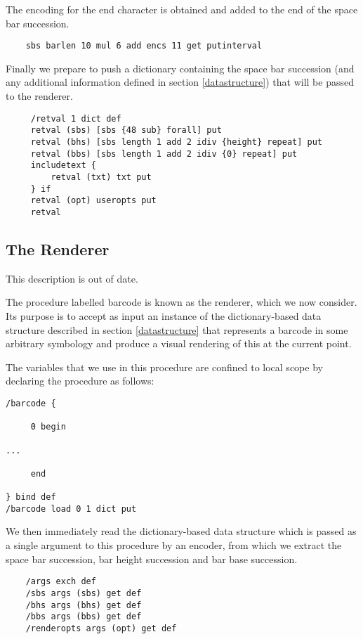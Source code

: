 \documentclass []{article}
\begin{document}
The encoding for the end character is obtained and added to 
the end of the space bar succession.

\begin{verbatim}
    sbs barlen 10 mul 6 add encs 11 get putinterval
\end{verbatim}

Finally we prepare to push a dictionary containing the space bar 
succession (and any additional information defined in section
\ref{datastructure}) that will be passed to the renderer.

\begin{verbatim}
     /retval 1 dict def
     retval (sbs) [sbs {48 sub} forall] put
     retval (bhs) [sbs length 1 add 2 idiv {height} repeat] put
     retval (bbs) [sbs length 1 add 2 idiv {0} repeat] put
     includetext {
         retval (txt) txt put
     } if
     retval (opt) useropts put
     retval
\end{verbatim}


\subsection{The Renderer}

This description is out of date.

The procedure labelled barcode is known as the renderer, which we now
consider. Its purpose is to accept as input an instance of the
dictionary-based data structure described in section
\ref{datastructure} that represents a barcode in some arbitrary
symbology and produce a visual rendering of this at the current
point.

The variables that we use in this procedure are confined to local
scope by declaring the procedure as follows:

\begin{verbatim}
/barcode {
 
     0 begin

...

     end

} bind def
/barcode load 0 1 dict put
\end{verbatim}

We then immediately read the dictionary-based data structure which 
is passed as a single argument to this procedure by an encoder, from
which we extract the space bar succession, bar height succession and bar
base succession.

\begin{verbatim}
    /args exch def
    /sbs args (sbs) get def
    /bhs args (bhs) get def
    /bbs args (bbs) get def
    /renderopts args (opt) get def
\end{verbatim}
\end{document}
